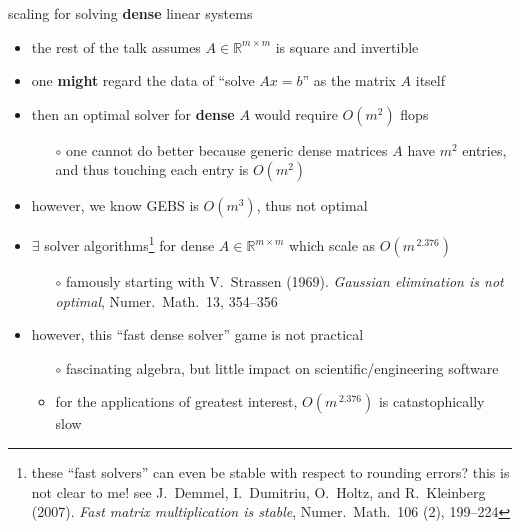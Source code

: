 \documentclass[10pt,
               svgnames,
               hyperref={colorlinks,citecolor=DeepPink4,linkcolor=FireBrick,urlcolor=Maroon},
               usepdftitle=false]{beamer}
\newcommand{\RR}{\mathbb{R}}
\begin{document}
\begin{frame}{scaling for solving \textbf{dense} linear systems}

\begin{itemize}
\item the rest of the talk assumes $A\in\RR^{m\times m}$ is square and invertible
\item one \textbf{might} regard the data of ``solve $Ax=b$'' as the matrix $A$ itself
\item then an optimal solver for \textbf{dense} $A$ would require $O(m^2)$ flops
   \begin{itemize}
   \item[$\circ$] one cannot do better because generic dense matrices $A$ have $m^2$ entries, and thus touching each entry is $O(m^2)$
   \end{itemize}
\item however, we know GEBS is $O(m^3)$, thus not optimal
\item $\exists$ solver algorithms\footnote{these ``fast solvers'' can even be stable with respect to rounding errors? this is not clear to me! see J.~Demmel, I.~Dumitriu, O.~Holtz, and R.~Kleinberg (2007). \emph{Fast matrix multiplication is stable}, Numer.~Math.~106 (2), 199--224} for dense $A\in\RR^{m\times m}$ which scale as $O(m^{\,2.376})$
   \begin{itemize}
   \item[$\circ$] famously starting with V.~Strassen (1969). \emph{Gaussian elimination is not optimal}, Numer.~Math.~13, 354--356
   \end{itemize}
\item however, this ``fast dense solver'' game is not practical
   \begin{itemize}
   \item[$\circ$] fascinating algebra, but little impact on scientific/engineering software
   \item<2>[$\circ$] \alert{for the applications of greatest interest, $O(m^{\,2.376})$ is catastophically slow}
   \end{itemize}
\end{itemize}
\end{frame}
\end{document}
